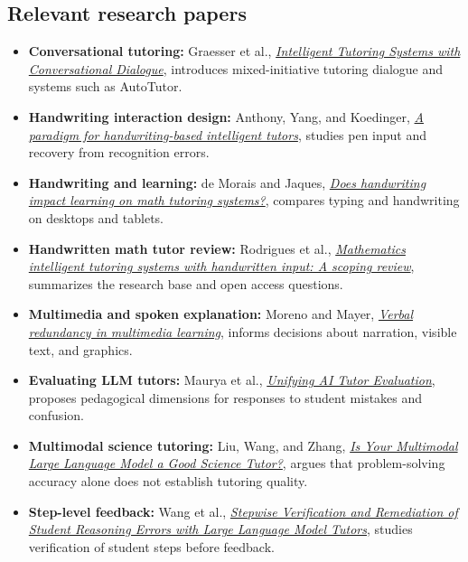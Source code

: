 \documentclass[11pt]{article}
\begin{document}
\subsection{Relevant research papers}
\begin{itemize}
\item \textbf{Conversational tutoring:} Graesser et al., \href{https://doi.org/10.1609/aimag.v22i4.1591}{\emph{Intelligent Tutoring Systems with Conversational Dialogue}}, introduces mixed-initiative tutoring dialogue and systems such as AutoTutor.\cite{autotutor}
\item \textbf{Handwriting interaction design:} Anthony, Yang, and Koedinger, \href{https://doi.org/10.1016/j.ijhcs.2012.04.003}{\emph{A paradigm for handwriting-based intelligent tutors}}, studies pen input and recovery from recognition errors.\cite{handwritingparadigm}
\item \textbf{Handwriting and learning:} de Morais and Jaques, \href{https://doi.org/10.15388/infedu.2022.03}{\emph{Does handwriting impact learning on math tutoring systems?}}, compares typing and handwriting on desktops and tablets.\cite{handwritingimpact}
\item \textbf{Handwritten math tutor review:} Rodrigues et al., \href{https://doi.org/10.1007/s10639-023-12145-3}{\emph{Mathematics intelligent tutoring systems with handwritten input: A scoping review}}, summarizes the research base and open access questions.\cite{handwritingreview}
\item \textbf{Multimedia and spoken explanation:} Moreno and Mayer, \href{https://doi.org/10.1037/0022-0663.94.1.156}{\emph{Verbal redundancy in multimedia learning}}, informs decisions about narration, visible text, and graphics.\cite{multimedia}
\item \textbf{Evaluating LLM tutors:} Maurya et al., \href{https://aclanthology.org/2025.naacl-long.57/}{\emph{Unifying AI Tutor Evaluation}}, proposes pedagogical dimensions for responses to student mistakes and confusion.\cite{tutoreval}
\item \textbf{Multimodal science tutoring:} Liu, Wang, and Zhang, \href{https://arxiv.org/abs/2505.06418}{\emph{Is Your Multimodal Large Language Model a Good Science Tutor?}}, argues that problem-solving accuracy alone does not establish tutoring quality.\cite{sciencetutor}
\item \textbf{Step-level feedback:} Wang et al., \href{https://arxiv.org/abs/2407.09136}{\emph{Stepwise Verification and Remediation of Student Reasoning Errors with Large Language Model Tutors}}, studies verification of student steps before feedback.\cite{stepwise}
\end{itemize}
\end{document}
